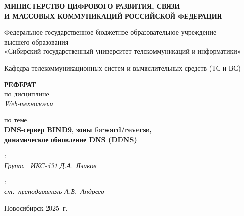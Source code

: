 \thispagestyle{empty}
\begin{center}
\textbf{МИНИСТЕРСТВО ЦИФРОВОГО РАЗВИТИЯ, СВЯЗИ}\\
\textbf{И МАССОВЫХ КОММУНИКАЦИЙ РОССИЙСКОЙ ФЕДЕРАЦИИ}

\vspace{14pt}

Федеральное государственное бюджетное образовательное учреждение\\
высшего образования\\
«Сибирский государственный университет телекоммуникаций и информатики»

\vspace{14pt}

Кафедра телекоммуникационных систем и вычислительных средств (ТС и ВС)
\end{center}

\vfill

\begin{center}
\textbf{РЕФЕРАТ}\\
по дисциплине\\
\textit{\guillemotleft Web-\foreignlanguage{russian}{технологии}\guillemotright}

\vspace{14pt}

по теме:\\
{\large\textbf{DNS-сервер BIND9, зоны forward/reverse,\\
динамическое обновление DNS (DDNS)}}
\end{center}

\vfill

:\\
\textit{Группа \textnumero~ИКС-531 \hfill Д.А.~Язиков}

\vspace{14pt}

:\\
\textit{ст.~преподаватель \hfill А.В.~Андреев}

\vfill

\begin{center}
Новосибирск 2025~г.
\end{center}
\newpage
